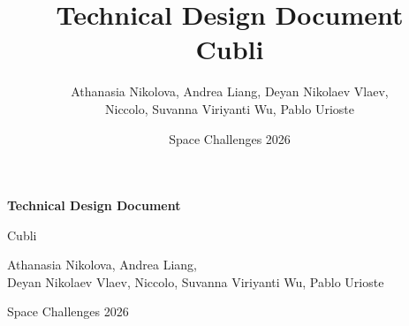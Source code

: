 \documentclass[11pt,a4paper]{article}
\title{\textbf{Technical Design Document}\\[0.5em]\Large Cubli}
\author{Athanasia Nikolova, Andrea Liang, Deyan Nikolaev Vlaev,\\
        Niccolo, Suvanna Viriyanti Wu, Pablo Urioste}
\date{Space Challenges 2026}
\begin{document}
\begin{titlepage}
    \centering
    \vspace*{1.5cm}
    {\LARGE \textbf{Technical Design Document}\par}
    \vspace{0.8cm}
    {\Large Cubli \par}
    \vspace{1cm}

    \begin{minipage}{0.6\textwidth}
        \centering
    \end{minipage}
    \par
    \vspace{1.2cm}

    {\large Athanasia Nikolova, Andrea Liang,\\[0.3em]
            Deyan Nikolaev Vlaev, Niccolo, Suvanna Viriyanti Wu, Pablo Urioste \par}
    \vspace{1cm}
    {\large Space Challenges 2026 \par}
    \vfill
\end{titlepage}

\tableofcontents
\newpage


\clearpage

\clearpage

\clearpage

\clearpage

\clearpage

\clearpage

\clearpage
\printbibliography[title={References}]
\clearpage
%
\end{document}
